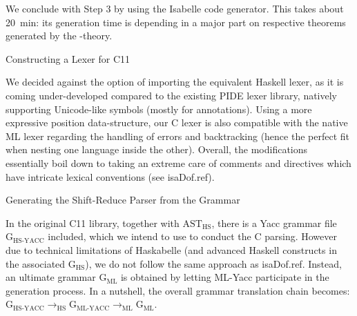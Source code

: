 \begin{isabellebody}
{}
\isamarkuptrue%
%
\endisatagdocument
{\isafolddocument}%
%
\isadelimdocument
%
\endisadelimdocument
%
\begin{isamarkuptext}%
We conclude with Step 3 by using the Isabelle code generator. This takes about 20~min:
its generation time is depending in a major part on respective theorems generated by the
-theory.%
\end{isamarkuptext}\isamarkuptrue%
%
\begin{isamarkupsubsection*}%
[label = {lexer},type = {scholarly_paper.technical}, args={label = {lexer},type = {scholarly_paper.technical}, Isa_COL.text_element.level = {}, Isa_COL.text_element.referentiable = {False}, Isa_COL.text_element.variants = {{STR ''outline'', STR ''document''}}, scholarly_paper.text_section.main_author = {}, scholarly_paper.text_section.fixme_list = {}, Isa_COL.text_element.level = {}, scholarly_paper.technical.definition_list = {}}]Constructing a Lexer for C11%
\end{isamarkupsubsection*}\isamarkuptrue%
%
\begin{isamarkuptext}%
We decided against the option of importing the equivalent Haskell lexer, as it is
coming under-developed compared to the existing PIDE lexer library, natively
supporting Unicode-like symbols (mostly for annotations). Using a more expressive position
data-structure, our C lexer is also compatible with the native ML lexer regarding the handling of
errors and backtracking (hence the perfect fit when nesting one language inside the other). Overall,
the modifications essentially boil down to taking an extreme care of comments and directives which
have intricate lexical conventions (see \csname isaDof.ref).%
\end{isamarkuptext}\isamarkuptrue%
%
\begin{isamarkupsubsection*}%
[label = {parser},type = {scholarly_paper.technical}, args={label = {parser},type = {scholarly_paper.technical}, Isa_COL.text_element.level = {}, Isa_COL.text_element.referentiable = {False}, Isa_COL.text_element.variants = {{STR ''outline'', STR ''document''}}, scholarly_paper.text_section.main_author = {}, scholarly_paper.text_section.fixme_list = {}, Isa_COL.text_element.level = {}, scholarly_paper.technical.definition_list = {}}]Generating the Shift-Reduce Parser from the Grammar%
\end{isamarkupsubsection*}\isamarkuptrue%
%
\begin{isamarkuptext}%
In the original C11 library, together with $\text{AST}_{\text{HS}}$, there is a Yacc
grammar file $\text{G}_{\text{HS-YACC}}$ included, which we intend to use to conduct the C
parsing. However due to technical limitations of Haskabelle (and advanced Haskell constructs in the
associated $\text{G}_{\text{HS}}$), we do not follow the same approach as \csname isaDof.ref. Instead, an ultimate grammar $\text{G}_{\text{ML}}$ is obtained by letting
ML-Yacc participate in the generation process. In a nutshell, the overall grammar translation chain
becomes: $\text{G}_{\text{HS-YACC}} \longrightarrow_{\text{HS}} \text{G}_{\text{ML-YACC}}
\longrightarrow_{\text{ML}} \text{G}_{\text{ML}}$.


\end{isamarkuptext}
\end{isabellebody}
